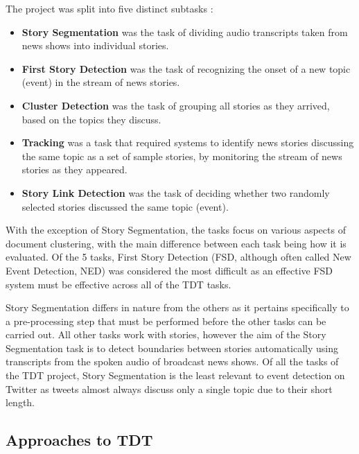 The project was split into five distinct subtasks \citep{Allan:2002:ITD:772260.772262}:

\begin{itemize}
\item \textbf{Story Segmentation} was the task of dividing audio transcripts taken from news shows into individual stories.

\item \textbf{First Story Detection} was the task of recognizing the onset of a new topic (event) in the stream of news stories.

\item \textbf{Cluster Detection} was the task of grouping all stories as they arrived, based on the topics they discuss.

\item \textbf{Tracking} was a task that required systems to identify news stories  discussing the same topic as a set of sample stories, by monitoring the stream of news stories as they appeared.

\item \textbf{Story Link Detection} was the task of deciding whether two randomly selected stories discussed the same topic (event).
\end{itemize}

With the exception of Story Segmentation, the tasks focus on various aspects of document clustering, with the main difference between each task being how it is evaluated.
Of the 5 tasks, First Story Detection (FSD, although often called New Event Detection, NED) was considered the most difficult \citep{Allan:2000:FSD:354756.354843} as an effective FSD system must be effective across all of the TDT tasks.

Story Segmentation differs in nature from the others as it pertains specifically to a pre-processing step that must be performed before the other tasks can be carried out.
All other tasks work with stories, however the aim of the Story Segmentation task is to detect boundaries between stories automatically using transcripts from the spoken audio of broadcast news shows.
Of all the tasks of the TDT project, Story Segmentation is the least relevant to event detection on Twitter as tweets almost always discuss only a single topic due to their short length.

\subsection{Approaches to TDT}
\label{background:sec:tdt}

